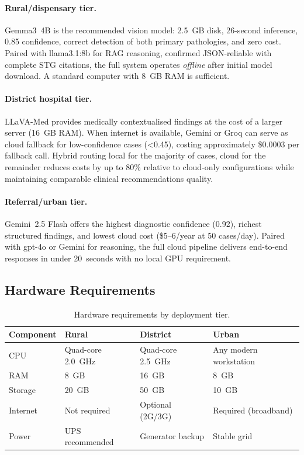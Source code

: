 \documentclass[12pt,a4paper]{report}
\begin{document}
	\paragraph{Rural/dispensary tier.}
	Gemma3~4B is the recommended vision model: 2.5~GB disk, 26-second inference,
	0.85 confidence, correct detection of both primary pathologies, and zero cost.
	Paired with llama3.1:8b for RAG reasoning, confirmed JSON-reliable with complete
	STG citations, the full system operates \emph{offline} after initial model
	download. A standard computer with 8~GB RAM is sufficient.
	
	\paragraph{District hospital tier.}
	LLaVA-Med provides medically contextualised findings at the cost of a larger
	server (16~GB RAM). When internet is available, Gemini or Groq can serve as
	cloud fallback for low-confidence cases (\textless0.45), costing approximately
	\$0.0003 per fallback call. Hybrid routing local for the majority of cases,
	cloud for the remainder reduces costs by up to 80\% relative to cloud-only
	configurations while maintaining comparable clinical recommendations quality.
	
	\paragraph{Referral/urban tier.}
	Gemini~2.5 Flash offers the highest diagnostic confidence (0.92), richest
	structured findings, and lowest cloud cost (\$5--6/year at 50 cases/day).
	Paired with gpt-4o or Gemini for reasoning, the full cloud pipeline delivers
	end-to-end responses in under 20~seconds with no local GPU requirement.
	
	\subsection{Hardware Requirements}
	
	\begin{table}[H]
		\centering
		\caption{Hardware requirements by deployment tier.}
		\label{tab:hardware_requirements}
		\small
		\renewcommand{\arraystretch}{1.2}
		\begin{tabularx}{\textwidth}{@{}l X X X@{}}
			\toprule
			\textbf{Component} & \textbf{Rural} & \textbf{District} & \textbf{Urban} \\
			\midrule
			CPU      & Quad-core 2.0~GHz & Quad-core 2.5~GHz & Any modern workstation \\
			RAM      & 8~GB              & 16~GB             & 8~GB \\
			Storage  & 20~GB             & 50~GB             & 10~GB \\
			Internet & Not required      & Optional (2G/3G)  & Required (broadband) \\
			Power    & UPS recommended   & Generator backup  & Stable grid \\
			\bottomrule
		\end{tabularx}
	\end{table}
	
\end{document}
